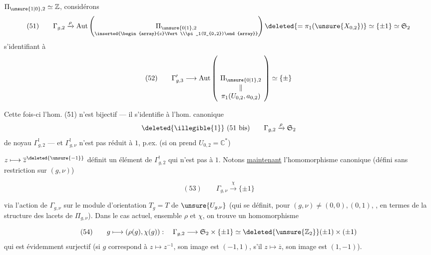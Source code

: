  $\Pi_{\unsure{1|0},2}\simeq\mathbb{Z}$, considérons
\[
(51)\qquad\Gamma_{g,2}\xrightarrow{\rho}\operatorname{Aut}\left(\underset{\inserted{\begin{array}{c}\Vert\\\pi_1(U_{0,2})\end{array}}}{\Pi_{\unsure{0|1},2}}\right)\deleted{=\pi_1(\unsure{X_{0,2}})}\simeq\{\pm1\}\simeq\mathfrak S_2
\]
s'identifiant à
\[
(52)\qquad\Gamma'_{g,3}\longrightarrow\operatorname{Aut}\left(\underset{\begin{array}{c}\Vert\\\pi_1(U_{0,2},a_{0,2})\end{array}}{\Pi_{\unsure{0|1},2}}\right)\simeq\{\pm\}
\]

Cette fois-ci l'hom. (51) n'est  bijectif --- il s'identifie à l'hom. canonique
\[
\deleted{\illegible{1}}\ (51\text{ bis})\qquad\Gamma_{g,2}\xrightarrow{\rho}\mathfrak S_2
\]
de noyau $\Gamma^!_{g,2}$ --- et $\Gamma^!_{g,\nu}$ n'est pas réduit à $1$, p.ex. (si on prend $U_{0,2}=\mathbb{C}^*$)

$z\longmapsto\overline z^{\deleted{\unsure{-1}}}$ définit un élément de $\Gamma^!_{g,2}$ qui n'est pas  à $1$. Notons \uline{maintenant} l'homomorphisme canonique (défini sans restriction sur $(g,\nu)$)

\[
(53)\qquad\Gamma_{g,\nu}\xrightarrow{\chi}\{\pm1\}
\]

via l'action de $\Gamma_{g,\nu}$ sur le module d'orientation $T_g=T$ de $\unsure{U_{g,\nu}}$  (qui se définit, pour $(g,\nu)\neq(0,0),(0,1)$, , en termes de la structure des lacets de $\Pi_{g,\nu}$). Dans le cas actuel,  ensemble $\rho$ et $\chi$, on trouve un homomorphisme

\[
(54)\qquad g\longmapsto(\rho(g),\chi(g)):\quad\Gamma_{g,2}\longrightarrow\mathfrak S_2\times\{\pm1\}
\simeq\deleted{\unsure{\mathbb{Z}_2}}(\pm1)\times(\pm1)
\]
qui est évidemment surjectif (si $g$ correspond à $z\longmapsto z^{-1}$, son image est $(-1,1)$, s'il  $z\longmapsto\overline z$, son image est $(1,-1)$).


